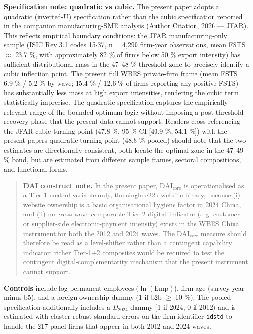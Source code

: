 \documentclass[12pt,a4paper]{article}
\begin{document}
\textbf{Specification note: quadratic vs cubic.} The present paper
adopts a quadratic (inverted-U) specification rather than the cubic
specification reported in the companion manufacturing-SME analysis
(Author Citation, 2026 --- JFAR). This reflects empirical boundary
conditions: the JFAR manufacturing-only sample (ISIC Rev 3.1 codes
15-37, n = 4,290 firm-year observations, mean FSTS \(\approx\) 23.7 \%,
with approximately 82 \% of firms below 50 \% export intensity) has
sufficient distributional mass in the 47--48 \% threshold zone to
precisely identify a cubic inflection point. The present full WBES
private-firm frame (mean FSTS = 6.9 \% / 5.2 \% by wave; 15.4 \% / 12.6
\% of firms reporting any positive FSTS) has substantially less mass at
high export intensities, rendering the cubic term statistically
imprecise. The quadratic specification captures the empirically relevant
range of the bounded-optimum logic without imposing a post-threshold
recovery phase that the present data cannot support. Readers
cross-referencing the JFAR cubic turning point (47.8 \%, 95 \% CI
{[}40.9 \%, 54.1 \%{]}) with the present paper\textquotesingle s
quadratic turning point (48.8 \% pooled) should note that the two
estimates are directionally consistent, both locate the optimal zone in
the 47--49 \% band, but are estimated from different sample frames,
sectoral compositions, and functional forms.

\begin{quote}
\textbf{DAI construct note.} In the present paper,
\(\mathrm{DAI}_{\text{core}}\) is operationalised as a Tier-1 control
variable only, the single c22b website binary, because (i) website
ownership is a basic organisational hygiene factor in 2024 China, and
(ii) no cross-wave-comparable Tier-2 digital indicator (e.g. customer-
or supplier-side electronic-payment intensity) exists in the WBES China
instrument for both the 2012 and 2024 waves. The
\(\mathrm{DAI}_{\text{core}}\) measure should therefore be read as a
level-shifter rather than a contingent capability indicator; richer
Tier-1+2 composites would be required to test the contingent
digital-complementarity mechanism that the present instrument cannot
support.
\end{quote}

\textbf{Controls} include log permanent employees
(\(\ln(\mathrm{Emp})\)), firm age (survey year minus b5), and a
foreign‑ownership dummy (1 if b2b \(\geq\) 10 \%). The pooled
specification additionally includes a \(D_{2024}\) dummy (1 if 2024, 0
if 2012) and is estimated with cluster-robust standard errors on the
firm identifier \texttt{idstd} to handle the 217 panel firms that appear
in both 2012 and 2024 waves.
\end{document}

